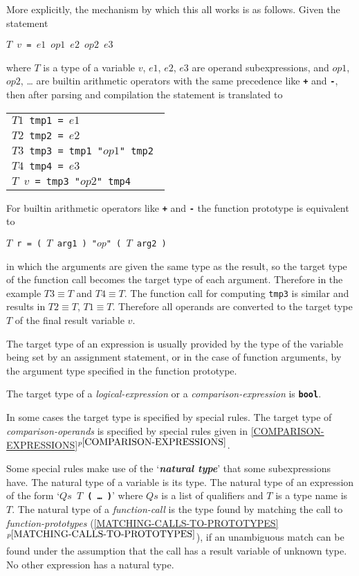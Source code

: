\documentclass[12pt]{article}
\newcommand{\TT}[1]{{\tt \bfseries #1}}
\newcommand{\key}[1]{{\bf \em #1}\index{#1}}
\newcommand{\itemref}[1]{\ref{#1}$^{p\pageref{#1}}$}
\begin{document}
More explicitly, the mechanism by which this all works is as
follows.  Given the statement
\begin{center}
\tt $T$ $v$ = $e1$ $op1$ $e2$ $op2$ $e3$
\end{center}
where $T$ is a type of a variable $v$, $e1$, $e2$, $e3$ are
operand subexpressions, and $op1$, $op2$, \ldots{} are builtin arithmetic
operators with the
same precedence like \TT{+} and \TT{-}, then
after parsing and compilation the statement is translated to
\begin{center}
\begin{tabular}{l}
\tt $T1$ tmp1 = $e1$ \\
\tt $T2$ tmp2 = $e2$ \\
\tt $T3$ tmp3 = tmp1 "$op1$" tmp2 \\
\tt $T4$ tmp4 = $e3$ \\
\tt $T$ $v$ = tmp3 "$op2$" tmp4 \\
\end{tabular}
\end{center}
For builtin arithmetic operators like \TT{+} and \TT{-} the function
prototype is equivalent to
\begin{center}
\tt $T$ r = ( $T$ arg1 ) "$op$" ( $T$ arg2 )
\end{center}
in which the arguments are given the same type as the result,
so the target type of the function call becomes the target type
of each argument.  Therefore in the example $T3\equiv T$ and
$T4\equiv T$.  The function call for computing {\tt tmp3} is
similar and results in $T2\equiv T$, $T1\equiv T$.  Therefore
all operands are converted to the target type $T$ of the final
result variable $v$.

The target type of an expression is usually provided by the
type of the variable being set by an assignment statement, or in the
case of function arguments, by the argument type specified in the
function prototype.

The target type of a {\em logical-expression} or a {\em comparison-expression}
is \TT{bool}.

In some cases the target type is specified by special rules.  The
target type of {\em comparison-operands} is specified by special
rules given in \itemref{COMPARISON-EXPRESSIONS}.

Some special rules
make use of the `\key{natural type}'\label{NATURAL-TYPE}
that some subexpressions have.
The natural type of a variable is its type.
The natural type of an expression of the
form `\TT{$Qs$ $T$ ( \ldots{} )}' where $Qs$ is a list of qualifiers
and $T$ is a type name is $T$.
The natural type of a {\em function-call} is the type found by matching
the call to {\em function-prototypes}
(\itemref{MATCHING-CALLS-TO-PROTOTYPES}), if an unambiguous
match can be found under the assumption that
the call has a result variable of unknown type.
No other expression has a natural type.
\end{document}
